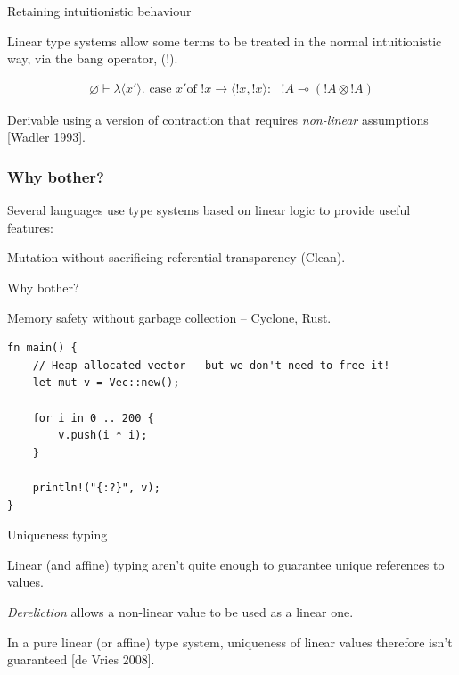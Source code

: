 \documentclass[10pt]{beamer}
\let\emptyset\varnothing
\newcommand{\case}{\text{ case }}
\newcommand{\of}{\text{of }}
\newcommand{\yields}{\multimap}
\begin{document}
\begin{frame}{Retaining intuitionistic behaviour}

Linear type systems allow some terms to be treated in the normal intuitionistic way, via the bang operator, (!).

\begin{eqnarray*}
\emptyset \vdash \lambda \langle x' \rangle . \case x' \of !x \rightarrow \langle !x, !x \rangle :\text{ } !A \yields (!A \otimes !A)
\end{eqnarray*}

Derivable using a version of contraction that requires \textit{non-linear} assumptions [Wadler 1993].

\end{frame}

\begin{frame}

\frametitle{Why bother?}

Several languages use type systems based on linear logic to provide useful features:

Mutation without sacrificing referential transparency (Clean).





\end{frame}

\begin{frame}[fragile]{Why bother?}

Memory safety without garbage collection -- Cyclone, Rust.

\begin{verbatim}
fn main() {
    // Heap allocated vector - but we don't need to free it!
    let mut v = Vec::new();

    for i in 0 .. 200 {
        v.push(i * i);
    }

    println!("{:?}", v);
}
\end{verbatim}

\end{frame}

\begin{frame}{Uniqueness typing}

Linear (and affine) typing aren't quite enough to guarantee unique references to values.

\textit{Dereliction} allows a non-linear value to be used as a linear one.

In a pure linear (or affine) type system, uniqueness of linear values therefore isn't guaranteed [de Vries 2008].
\end{frame}
\end{document}
